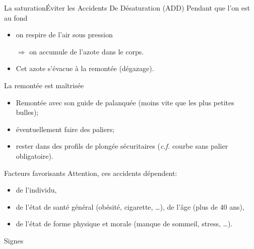 \begin{frame}{La saturation}{Éviter les Accidents De Désaturation (ADD)}
Pendant que l'on est au fond
\begin{itemize}[<+->]
\item on respire de l'air sous pression
\item[$\Rightarrow$] on accumule de l'azote dans le corps.
\item Cet azote s'évacue à la remontée (dégazage).
\end{itemize}
\end{frame}

\begin{frame}{La remontée est maîtrisée}
\begin{block}{}
\begin{itemize}[<+->]
\item Remontée avec son guide de palanquée (moins vite que les plus petites bulles);
\item éventuellement faire des paliers;
\item rester dans des profils de plongée sécuritaires (\emph{c.f.} courbe sans palier obligatoire).
\end{itemize}
\end{block}
\end{frame}

\begin{frame}{Facteurs favorisants}
Attention, ces accidents dépendent:
\begin{itemize}[<+(1)->]
\item de l'individu,
\item de l'état de santé général (obésité, cigarette, \dots), de l'âge (plus de 40 ans),
\item de l'état de forme physique et morale (manque de sommeil, stress, \dots).
\end{itemize}
\end{frame}

\begin{frame}{Signes}
\end{frame}

